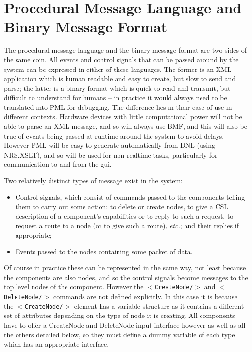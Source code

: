 \documentclass[pdftex,a4paper]{article}
\newcommand{\etc}{{\it etc.}}
\newcommand{\XML}[2][]{{\tt \small $<$#2#1/$>$}}
\begin{document}
\section{Procedural Message Language and Binary Message Format}
\label{sec:pmlbmf}

The procedural message language and the binary message format are two
sides of the same coin. All events and control signals that can be
passed around by the system can be expressed in either of these
languages. The former is an XML application which is human readable
and easy to create, but slow to send and parse; the latter is a binary
format which is quick to read and transmit, but difficult to
understand for humans -- in practice it would always need to be
translated into PML for debugging. The difference lies in their ease
of use in different contexts. Hardware devices with little
computational power will not be able to parse an XML message, and so
will always use BMF, and this will also be true of events being passed
at runtime around the system to avoid delays. However PML will be easy
to generate automatically from DNL (using NRS.XSLT), and so will be
used for non-realtime tasks, particularly for communication to and
from the gui.

Two relatively distinct types of message exist in the system:

\begin{itemize}

\item Control signals, which consist of commands passed to the
  components telling them to carry out some action: to delete or
  create nodes, to give a CSL description of a component's
  capabilities or to reply to such a request, to request a route to a
  node (or to give such a route), \etc; and their replies if
  appropriate;

\item Events passed to the nodes containing some packet of data.

\end{itemize}

Of course in practice these can be represented in the same way, not
least because the components are also nodes, and so the control
signals become messages to the top level nodes of the
component. However the \XML{CreateNode} and \XML{DeleteNode} commands
are not defined explicitly. In this case it is because the
\XML{CreateNode} element has a variable structure as it contains a
different set of attributes depending on the type of node it is
creating. All components have to offer a CreateNode and DeleteNode
input interface however as well as all the others detailed below, so
they must define a dummy variable of each type which has an
appropriate interface.
\end{document}
